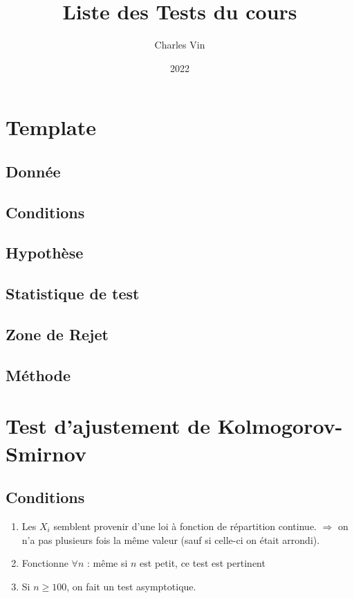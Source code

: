 \documentclass{article}
\title{Liste des Tests du cours}
\author{Charles Vin}
\date{2022}
\theoremstyle{plain}%
\theoremstyle{definition}
\theoremstyle{remark}
\begin{document}
\maketitle
\tableofcontents

\section{Template}
\subsection*{Donnée}
\subsection*{Conditions}
\subsection*{Hypothèse}
\subsection*{Statistique de test}
\subsection*{Zone de Rejet}
\subsection*{Méthode}

\section{Test d'ajustement de Kolmogorov-Smirnov}


\subsection*{Conditions}
\begin{enumerate}
    \item Les $ X_i $ semblent provenir d'une loi à fonction de répartition continue. $ \Rightarrow  $ on n'a pas plusieurs fois la même valeur (sauf si celle-ci on était arrondi).\\
    \item Fonctionne $ \forall n $ : même si $ n $ est petit, ce test est pertinent
    \item Si $ n \geq 100 $, on fait un test asymptotique.
\end{enumerate}
\end{document}
